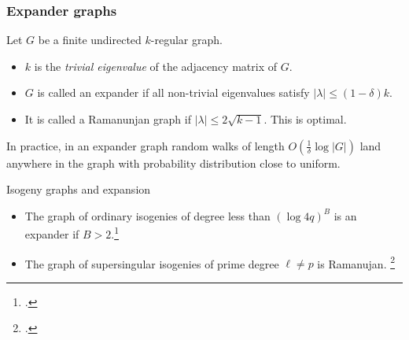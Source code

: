 \documentclass{beamer}
\begin{document}
\begin{frame}
  \frametitle{Expander graphs}
  Let $G$ be a finite undirected $k$-regular graph.

  \begin{itemize}
  \item $k$ is the \emph{trivial eigenvalue} of the adjacency matrix
    of $G$.
  \item $G$ is called an \alert{expander} if all non-trivial
    eigenvalues satisfy \emph{$\lvert\lambda\rvert \le (1-\delta)k$}.
  \item It is called a \alert{Ramanunjan graph} if
    \emph{$\lvert\lambda\rvert\le 2\sqrt{k-1}$}. This is
    \alert{optimal}.
  \end{itemize}
  
  In practice, in an expander graph \alert{random walks} of length
  \emph{$O(\frac{1}{\delta}\log\lvert G\rvert)$} land anywhere in the
  graph with probability distribution \alert{close to uniform}.

  \begin{block}{Isogeny graphs and expansion}
    \begin{itemize}
    \item The graph of \alert{ordinary isogenies} of degree less than
      \emph{$(\log 4q)^B$} is an \alert{expander} if
      \emph{$B>2$}.\footcite{jao+miller+venkatesan09}
    \item The graph of \alert{supersingular isogenies} of prime degree
      \emph{$\ell\ne p$} is
      \alert{Ramanujan}. \footcite{pizer1,pizer2}
    \end{itemize}
  \end{block}
\end{frame}

\end{document}
